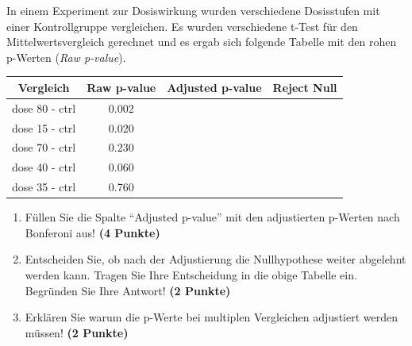 \documentclass[a4paper, 9pt]{scrartcl}\usepackage[]{graphicx}\usepackage[]{xcolor}
\newenvironment{knitrout}{}{} %
\begin{document}
In einem Experiment zur Dosiswirkung wurden verschiedene Dosisstufen mit
einer Kontrollgruppe vergleichen. Es wurden verschiedene t-Test f{\"u}r den
Mittelwertsvergleich gerechnet und es ergab sich folgende Tabelle mit den
rohen p-Werten (\textit{Raw p-value}).


\begin{knitrout}
\color{fgcolor}\begin{table}[!h]
\centering\begingroup\fontsize{12}{14}\selectfont

\begin{tabular}{cccc}
\toprule
Vergleich & Raw p-value & Adjusted p-value & Reject Null\\
\midrule
dose 80 - ctrl & 0.002 &  & \\
dose 15 - ctrl & 0.020 &  & \\
dose 70 - ctrl & 0.230 &  & \\
dose 40 - ctrl & 0.060 &  & \\
dose 35 - ctrl & 0.760 &  & \\
\bottomrule
\end{tabular}
\endgroup{}
\end{table}

\end{knitrout}



\begin{enumerate}
\item F{\"u}llen Sie die Spalte "`Adjusted p-value"' mit den adjustierten
  p-Werten nach Bonferoni aus! \textbf{(4 Punkte)}
\item Entscheiden Sie, ob nach der Adjustierung die Nullhypothese weiter
  abgelehnt werden kann. Tragen Sie Ihre Entscheidung in die obige Tabelle
  ein. Begr{\"u}nden Sie Ihre Antwort! \textbf{(2 Punkte)}
\item Erkl{\"a}ren Sie warum die p-Werte bei multiplen Vergleichen
  adjustiert werden m{\"u}ssen! \textbf{(2 Punkte)}
\end{enumerate}
\end{document}
